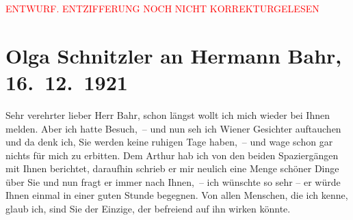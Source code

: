 
\begin{center}
            \textcolor{red}{ENTWURF. ENTZIFFERUNG NOCH NICHT KORREKTURGELESEN}
                      \end{center}
            
               \section[Olga Schnitzler an Hermann Bahr, 16. 12. 1921]{ Olga Schnitzler an Hermann Bahr, 16. 12. 1921}\nopagebreak{}\rehead{ }\begin{ledgroupsized}[t]{13cm}\normalsize\beginnumbering{} \toendnotes[C]{\smallbreak\pagebreak[2]} 
\toendnotes[C]{\smallbreak}\pstart{}{\pb}Sehr verehrter lieber Herr Bahr,\pend\pstart
           schon längst wollt ich mich wieder bei Ihnen melden. Aber ich hatte Besuch, –
               und nun seh ich Wiener Gesichter auftauchen und da
               denk ich, Sie werden keine ruhigen Tage haben, – und wage schon gar nichts für
               mich zu erbitten.\pend
           \pstart
           Dem Arthur hab ich von den beiden Spaziergängen
               mit Ihnen berichtet, daraufhin schrieb er mir neulich eine Menge schöner Dinge über
               Sie und nun fragt er immer nach Ihnen, – ich wünschte so sehr – er würde Ihnen
               einmal in einer guten Stunde begegnen. Von allen Menschen, die ich kenne, glaub ich,
               sind Sie der Einzige, der befreiend auf ihn wirken könnte.\pend

\end{ledgroupsized}
